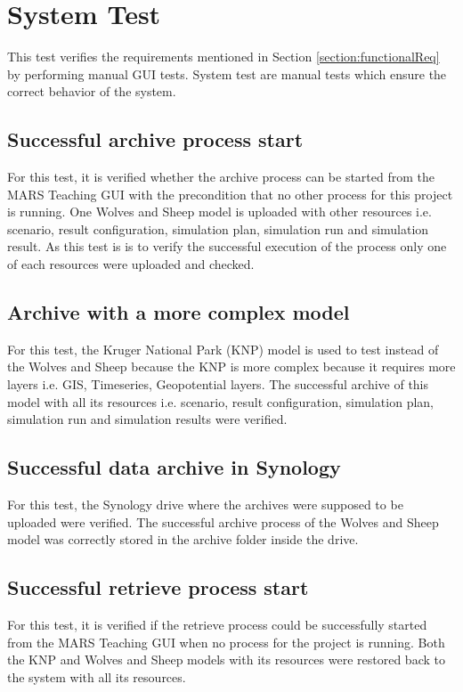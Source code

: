 \section{System Test}
This test verifies the requirements mentioned in Section \ref{section:functionalReq} by performing manual GUI tests. System test are manual tests
which ensure the correct behavior of the system.

\subsection{Successful archive process start}
For this test, it is verified whether the archive process can be started from the MARS Teaching GUI with the precondition that no other process
for this project is running. One Wolves and Sheep model is uploaded with other resources i.e. scenario, result configuration,
simulation plan, simulation run and simulation result. As this test is is to verify the successful execution of the process only one of each resources
were uploaded and checked.

\subsection{Archive with a more complex model}
For this test, the Kruger National Park (KNP) model is used to test instead of the Wolves and Sheep because the KNP is more complex because it requires more layers
i.e. GIS, Timeseries, Geopotential layers. The successful archive of this model with all its resources i.e. scenario, result configuration, simulation plan, simulation run
and simulation results were verified. 

\subsection{Successful data archive in Synology}
For this test, the Synology drive where the archives were supposed to be uploaded were verified. The successful archive process of the Wolves and Sheep model
was correctly stored in the archive folder inside the drive.

\subsection{Successful retrieve process start}
For this test, it is verified if the retrieve process could be successfully started from the MARS Teaching GUI when no process for the project is running.
Both the KNP and Wolves and Sheep models with its resources were restored back to the system with all its resources. 

